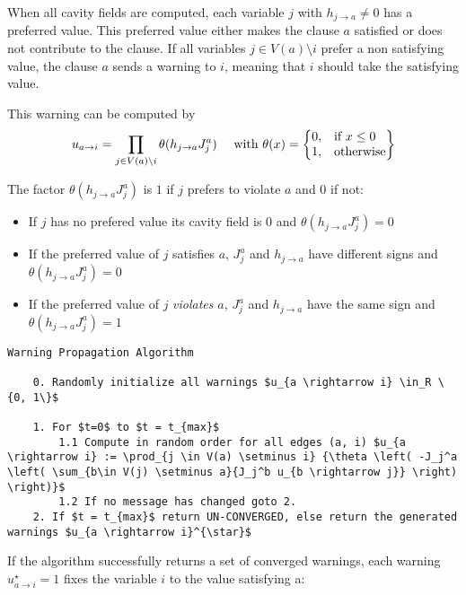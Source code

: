 When all cavity fields are computed, each variable $j$ with $h_{j \rightarrow a} \neq 0$ has a preferred value. This preferred value either makes the clause $a$ satisfied or does not contribute to the clause. If all variables $j \in V(a)\setminus i$ prefer a non satisfying value, the clause $a$ sends a warning to $i$, meaning that $i$ should take the satisfying value.

This warning can be computed by $$u_{a \rightarrow i} = \prod_{j\in V(a)\setminus i}{\theta(h_{j \rightarrow a}J_j^a)} \quad \text{ with } \theta(x) = \left\{
  \begin{array}{@{}ll@{}}
    0, & \text{if}\ x \leq 0 \\
    1, & \text{otherwise}
  \end{array}\right\}$$

The factor $\theta(h_{j \rightarrow a}J_j^a)$ is $1$ if $j$ prefers to violate $a$ and $0$ if not:
\begin{itemize}
\item[] If $j$ has no prefered value its cavity field is $0$ and $\theta(h_{j \rightarrow a}J_j^a) = 0$
\item[] If the preferred value of $j$ satisfies $a$, $J_j^a$ and $h_{j \rightarrow a}$ have different signs and $\theta(h_{j \rightarrow a}J_j^a) = 0$
\item[] If the preferred value of $j$ \emph{violates} $a$, $J_j^a$ and $h_{j \rightarrow a}$ have the same sign and $\theta(h_{j \rightarrow a}J_j^a) = 1$
\end{itemize}


\begin{lstlisting}[mathescape=true]
	Warning Propagation Algorithm
	
	0. Randomly initialize all warnings $u_{a \rightarrow i} \in_R \{0, 1\}$
	
	1. For $t=0$ to $t = t_{max}$
		1.1 Compute in random order for all edges (a, i) $u_{a \rightarrow i} := \prod_{j \in V(a) \setminus i} {\theta \left( -J_j^a \left( \sum_{b\in V(j) \setminus a}{J_j^b u_{b \rightarrow j}} \right) \right)}$
		1.2 If no message has changed goto 2.
	2. If $t = t_{max}$ return UN-CONVERGED, else return the generated warnings $u_{a \rightarrow i}^{\star}$
\end{lstlisting}

If the algorithm successfully returns a set of converged warnings, each warning $u^{\star}_{a \rightarrow i} = 1$ fixes the variable $i$ to the value satisfying a:



